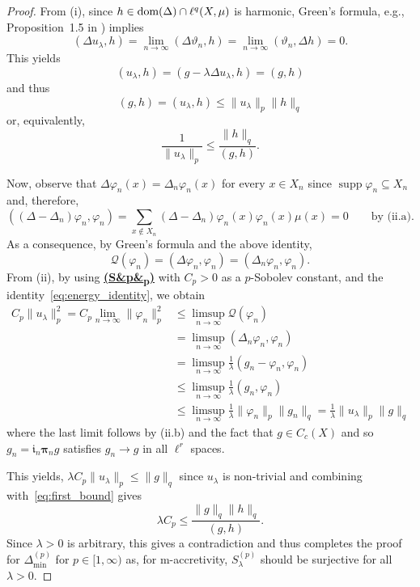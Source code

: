 \documentclass[letterpaper]{article}
\theoremstyle{definition}
\theoremstyle{named}
\numberwithin{equation}{section}
\newcommand{\SP}[1][]{\hyperlink{ass:SP}{\textup{\textbf{(S\ifx&#1&\else\textsubscript{#1}\fi)}}}}
\newcommand{\Q}{\mathcal{Q}}
\newcommand{\lm}{\lambda}
\newcommand{\dom}{\textnormal{dom}} %
\newcommand{\deltam}{\Delta_{\min}}
\begin{document}
\begin{proof}
From (i),  since $h \in \dom(\Delta) \cap \ell^q(X,\mu)$ is harmonic, Green's formula, 
e.g., Proposition~1.5 in \cite{keller2021graphs}) implies
    $$
    (\Delta u_\lm, h) = \lim_{n \to \infty}(\Delta \vartheta_n, h)= \lim_{n \to \infty}(\vartheta_n, \Delta h)=0.
    $$
    This yields
    $$
    (u_\lm, h)=(g-\lm\Delta u_\lm, h) = (g,h)
    $$
    and thus 
    \begin{equation*}
        (g,h)=(u_\lm, h) \leq \|u_\lm\|_p \|h\|_q
    \end{equation*}
    or, equivalently,
    \begin{equation}\label{eq:first_bound}
        \frac{1}{\|u_\lm\|_p} \leq \frac{\|h\|_q}{(g,h)}.
    \end{equation}

Now, observe that $\Delta\varphi_n(x) = \Delta_n\varphi_n (x)$ for every $x\in X_n$ since
$\operatorname{supp} \varphi_n \subseteq X_n$
and, therefore,
\begin{equation*}
    ((\Delta - \Delta_n) \varphi_n, \varphi_n) = \sum_{x\notin X_n} (\Delta - \Delta_n)\varphi_n(x) \varphi_n(x)\mu(x) = 0 \qquad \mbox{by (ii.a)}.
  \end{equation*}
As a consequence, by Green's formula and the above identity,
\begin{equation}\label{eq:energy_identity}
\Q(\varphi_n) = (\Delta \varphi_n, \varphi_n) = (\Delta_n \varphi_n, \varphi_n).
\end{equation}
    From (ii), by using \SP[p] with $C_p>0$ as a $p$-Sobolev constant, and the identity~\eqref{eq:energy_identity}, we obtain
    \begin{align*}
        C_p \|u_\lm\|_p^2 = C_p \lim_{n \to \infty} \|\varphi_n\|_p^2 &\leq \limsup_{n \to \infty} \Q(\varphi_n) \\
        &= \limsup_{n \to \infty}( \Delta_n \varphi_n, \varphi_n)\\
        &= \limsup_{n \to \infty} \frac{1}{\lm} ( g_n -\varphi_n, \varphi_n )\\
        &\leq \limsup_{n \to \infty} \frac{1}{\lm}(g_n, \varphi_n)\\
        &\leq \limsup_{n \to \infty} \frac{1}{\lm} \|\varphi_n\|_p \|g_n\|_q = \frac{1}{\lm} \|u_\lm\|_p \|g\|_q
    \end{align*} 
 where the last limit follows by (ii.b) and the fact that $g\in C_c(X)$ 
 and so $g_n = \boldsymbol{\mathfrak{i}}_n\boldsymbol{\pi}_n g$ satisfies 
 $g_n \to g$ in all $\ell^r$ spaces. 
 
 
 This yields, $\lm C_p \|u_\lm\|_p \leq \|g\|_q$ since $u_\lm$
 is non-trivial and combining with~\eqref{eq:first_bound} gives
    $$\lm C_p \leq \frac{\|g\|_q \|h\|_q}{(g,h)}.$$
    Since $\lm>0$ is arbitrary,
    this gives a contradiction and thus 
    completes the proof for $\deltam^{(p)}$ for $p \in [1, \infty)$ 
    as, for m-accretivity, $S^{(p)}_\lm$ should be surjective for all $\lm>0$.



\end{proof}
\end{document}
